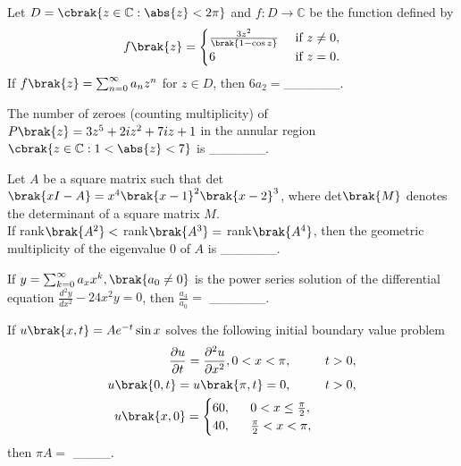     \item Let $D = \cbrak{z \in \mathbb{C} : \abs{z} < 2 \pi}$ and $f : D \rightarrow \mathbb{C}$ be the function defined by
        \begin{align*}
            f\brak{z} = 
            \begin{cases}
                \frac{3 z^2}{\brak{1 - \cos z}} &\text{ if } z \neq 0,\\
                6 &\text{ if } z = 0.
            \end{cases}
        \end{align*}
        If $f\brak{z} = \sum_{n=0}^{\infty} a_n z^n$ for $z \in D$, then $6a_2=$\_\_\_\_\_\_.

    \item The number of zeroes (counting multiplicity) of $P\brak{z} = 3z^5 + 2iz^2 + 7iz + 1$ in the annular region $\cbrak{z \in \mathbb{C} : 1<\abs{z}<7}$ is \_\_\_\_\_\_.

    \item Let $A$ be a square matrix such that det$\brak{xI - A} = x^4\brak{x-1}^2 \brak{x-2}^3$, where det$\brak{M}$ denotes the determinant of a square matrix $M$. \\ If rank$\brak{A^2} <$ rank$\brak{A^3}=$ rank$\brak{A^4}$, then the geometric multiplicity of the eigenvalue $0$ of $A$ is \_\_\_\_\_\_.

    \item If $y = \sum_{k=0}^{\infty} a_x x^k, \brak{a_0 \neq 0}$ is the power series solution of the differential equation $\frac{d^2y}{dx^2} - 24x^2y = 0$, then $\frac{a_4}{a_0} =$ \_\_\_\_\_\_.

    \item If $u\brak{x,t} = A e^{-t} \sin x$ solves the following initial boundary value problem
        \begin{align*}
            \frac{\partial u}{\partial t} = \frac{\partial ^2 u}{\partial x^2}, 0<x<\pi,  \hspace{1cm} &t>0,\\
            u\brak{0,t} = u\brak{\pi,t} = 0, \hspace{1cm} &t>0,\\
            u\brak{x,0} = 
                \begin{cases}
                    60,\, \hspace{0.5cm} 0<x \leq \frac{\pi}{2}, \\
                    40,\, \hspace{0.5cm} \frac{\pi}{2} < x < \pi,
                \end{cases}
        \end{align*}
        then $\pi A =$ \_\_\_\_.
        
